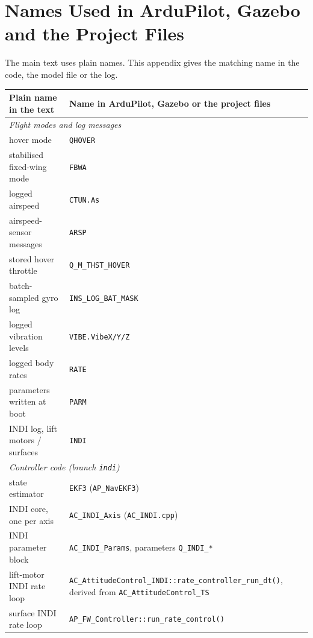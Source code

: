 \documentclass{article}
\begin{document}
\section{Names Used in ArduPilot, Gazebo and the Project Files}
\label{sec:appendix-names}
The main text uses plain names. This appendix gives the matching name in the code, the model file or the log.

\begin{longtable}{p{}p{}}
\textbf{Plain name in the text} & \textbf{Name in ArduPilot, Gazebo or the project files} \\
\midrule
\multicolumn{2}{l}{\emph{Flight modes and log messages}} \\
\midrule
hover mode & \texttt{QHOVER} \\
\midrule
stabilised fixed-wing mode & \texttt{FBWA} \\
\midrule
logged airspeed & \texttt{CTUN.As} \\
\midrule
airspeed-sensor messages & \texttt{ARSP} \\
\midrule
stored hover throttle & \texttt{Q\_M\_THST\_HOVER} \\
\midrule
batch-sampled gyro log & \texttt{INS\_\allowbreak{}LOG\_\allowbreak{}BAT\_\allowbreak{}MASK} \\
\midrule
logged vibration levels & \texttt{VIBE.VibeX/Y/Z} \\
\midrule
logged body rates & \texttt{RATE} \\
\midrule
parameters written at boot & \texttt{PARM} \\
\midrule
INDI log, lift motors / surfaces & \texttt{INDI} \\
\midrule
\multicolumn{2}{l}{\emph{Controller code (branch \texttt{indi})}} \\
\midrule
state estimator & \texttt{EKF3} (\texttt{AP\_NavEKF3}) \\
\midrule
INDI core, one per axis & \texttt{AC\_INDI\_Axis} (\texttt{AC\_INDI.cpp}) \\
\midrule
INDI parameter block & \texttt{AC\_INDI\_Params}, parameters \texttt{Q\_INDI\_*} \\
\midrule
lift-motor INDI rate loop & \texttt{AC\_\allowbreak{}AttitudeControl\_\allowbreak{}INDI::\allowbreak{}rate\_\allowbreak{}controller\_\allowbreak{}run\_\allowbreak{}dt()}, derived from \texttt{AC\_\allowbreak{}AttitudeControl\_\allowbreak{}TS} \\
\midrule
surface INDI rate loop & \texttt{AP\_\allowbreak{}FW\_\allowbreak{}Controller::\allowbreak{}run\_\allowbreak{}rate\_\allowbreak{}control()} \\

\end{longtable}
\end{document}
